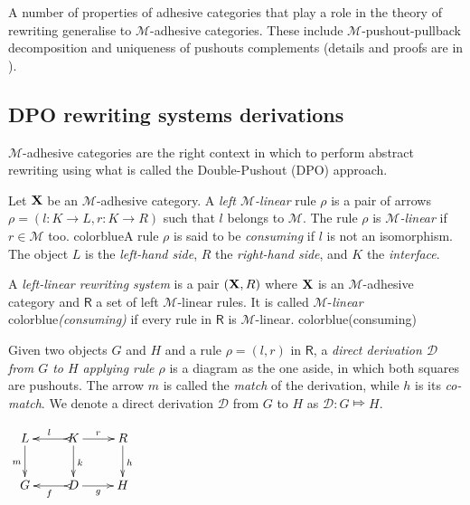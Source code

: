 \documentclass[a4paper,UKenglish,cleveref,pdftex,thm-restate,numberwithinsect]{lipics-v2021}
\newcommand{\full}[1]{{color{blue}#1}}
\newcommand{\full}[1]{}
\def\R{\mathsf{R}}
\def\X{\textbf {\textup{X}}}
\def\G{\textbf {\textup{G}}}
\newcommand{\dder}[1]{\mathscr{#1}}
\begin{document}
A number of properties of adhesive categories that play a role in the
theory of rewriting generalise to $\mathcal{M}$-adhesive
categories. These include $\mathcal{M}$-pushout-pullback decomposition
and uniqueness of pushouts complements (details and proofs are in
).

\subsection{DPO rewriting systems derivations}\label{subsec:DPO}

$\mathcal{M}$-adhesive categories are the right context in which to
perform abstract rewriting using what is called the Double-Pushout
(DPO) approach.


\begin{definition}
  Let $\X$ be an $\mathcal{M}$-adhesive category. A \emph{left
    $\mathcal{M}$-linear} rule $\rho$ is a pair  of
  arrows $\rho = (l: K \to L, r: K \to R)$ such that $l$ belongs to
  $\mathcal{M}$.  The rule $\rho$ is \emph{$\mathcal{M}$-linear} if
  $r\in \mathcal{M}$ too.
  \full{A rule $\rho$ is said to be
    \emph{consuming} if $l$ is not an isomorphism.}%
  The object $L$ is
  the \emph{left-hand side}, $R$ the \emph{right-hand side}, and
  $K$ the \emph{interface}. 

  A \emph{left-linear rewriting system} is a pair $(\X, \R)$ where
  $\X$ is an $\mathcal{M}$-adhesive category and $\R$ a set of left
  $\mathcal{M}$-linear rules. It  is
  called $\mathcal{M}$-\emph{linear}
  \full{\emph{(consuming)}}%
  if every rule in $\R$ is
  $\mathcal{M}$-linear.
  \full{(consuming)}

  \vspace{.1cm}
  \noindent
  \parbox{10cm}{\hspace{15pt}Given two objects $G$ and $H$ and a rule
    $\rho=(l,r)$ in $\R$, a \emph{direct derivation $\mathscr{D}$ from
      $G$ to $H$ applying rule $\rho$} is a diagram as the one
    aside, in which both squares are pushouts. The arrow $m$ is called
    the \emph{match} of the derivation, while $h$ is its
    \emph{co-match}.  We denote a direct derivation $\dder{D}$
    from $G$ to $H$ as $\dder{D}\colon G\Mapsto H$. }
  \parbox{3cm}{$\xymatrix{L \ar[d]_{m}& K \ar[d]^{k}\ar@{>->}[l]_{l}
      \ar[r]^{r} & R \ar[d]^{h}\\G & \ar@{>->}[l]^{f} D \ar[r]_{g}&
      H}$}
\end{definition}
\end{document}
